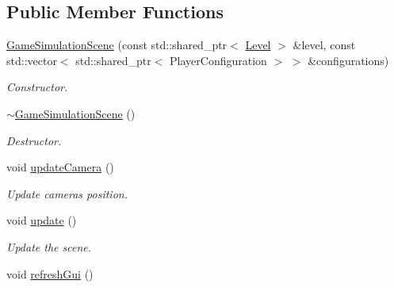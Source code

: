 \subsection*{Public Member Functions}
\begin{DoxyCompactItemize}
\item 
\mbox{\label{classGameSimulationScene_a979dd106ca106b60542b77eaa99b43bf}} 
\hyperlink{classGameSimulationScene_a979dd106ca106b60542b77eaa99b43bf}{Game\+Simulation\+Scene} (const std\+::shared\+\_\+ptr$<$ \hyperlink{classLevel}{Level} $>$ \&level, const std\+::vector$<$ std\+::shared\+\_\+ptr$<$ Player\+Configuration $>$ $>$ \&configurations)
\begin{DoxyCompactList}\small\item\em Constructor. \end{DoxyCompactList}\item 
\mbox{\label{classGameSimulationScene_af45f3e7f70376e59a6f320f21ce2897b}} 
\hyperlink{classGameSimulationScene_af45f3e7f70376e59a6f320f21ce2897b}{$\sim$\+Game\+Simulation\+Scene} ()
\begin{DoxyCompactList}\small\item\em Destructor. \end{DoxyCompactList}\item 
\mbox{\label{classGameSimulationScene_aae1a8d0e8d3f8b1cc51c9291b96c52ec}} 
void \hyperlink{classGameSimulationScene_aae1a8d0e8d3f8b1cc51c9291b96c52ec}{update\+Camera} ()
\begin{DoxyCompactList}\small\item\em Update camera\textquotesingle{}s position. \end{DoxyCompactList}\item 
\mbox{\label{classGameSimulationScene_ad8aa00e84395730039cfb6ef926917ea}} 
void \hyperlink{classGameSimulationScene_ad8aa00e84395730039cfb6ef926917ea}{update} ()
\begin{DoxyCompactList}\small\item\em Update the scene. \end{DoxyCompactList}\item 
\mbox{\label{classGameSimulationScene_a3a942f77be9bdb23ff0486e356f4792e}} 
void \hyperlink{classGameSimulationScene_a3a942f77be9bdb23ff0486e356f4792e}{refresh\+Gui} ()

\end{DoxyCompactItemize}
